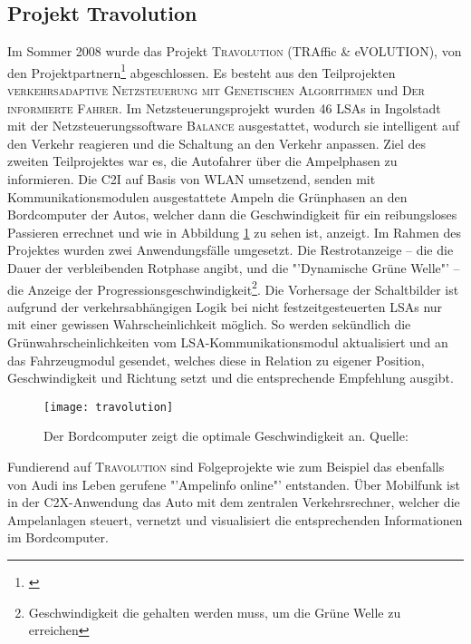 \subsection*{\label{sec:travolution}Projekt Travolution}
Im Sommer 2008 wurde das Projekt \textsc{Travolution} (TRAffic \& eVOLUTION), von den Projektpartnern\footnote{\cite{Travolution}} abgeschlossen. Es besteht aus den Teilprojekten \textsc{verkehrsadaptive Netzsteuerung mit Genetischen Algorithmen} und \textsc{Der informierte Fahrer}. Im Netzsteuerungsprojekt wurden 46 \glspl{LSA} in Ingolstadt mit der Netzsteuerungssoftware \textsc{Balance} ausgestattet, wodurch sie intelligent auf den Verkehr reagieren und die Schaltung an den Verkehr anpassen.  Ziel des zweiten Teilprojektes war es, die Autofahrer über die Ampelphasen zu informieren. Die \gls{C2I} auf Basis von \gls{WLAN} umsetzend, senden mit Kommunikationsmodulen ausgestattete Ampeln die Grünphasen an den Bordcomputer der Autos, welcher dann die Geschwindigkeit für ein reibungsloses Passieren errechnet\cite{Stvtechnik} und wie in Abbildung \ref{fig:travolution} zu sehen ist, anzeigt. Im Rahmen des Projektes wurden zwei Anwendungsfälle umgesetzt. Die Restrotanzeige -- die die Dauer der verbleibenden Rotphase angibt, und die "'Dynamische Grüne Welle"' -- die Anzeige der Progressionsgeschwindigkeit\footnote{ Geschwindigkeit die gehalten werden muss, um die Grüne Welle zu erreichen}.
Die Vorhersage der Schaltbilder ist aufgrund der verkehrsabhängigen Logik bei nicht festzeitgesteuerten \glspl{LSA} nur mit einer gewissen Wahrscheinlichkeit möglich. So werden sekündlich die Grünwahrscheinlichkeiten vom \gls{LSA}-Kommunikationsmodul aktualisiert und an das Fahrzeugmodul gesendet, welches diese in Relation zu eigener Position, Geschwindigkeit und Richtung setzt und die entsprechende Empfehlung ausgibt.\\
\begin{figure}[H]  
    \centering  
    \texttt{[image: travolution]}   
    \grayRule
    \caption[Projekt Travolution]{Der Bordcomputer zeigt die optimale Geschwindigkeit an. Quelle: \cite{Travolution}}
    \label{fig:travolution}
\end{figure} 
Fundierend auf \textsc{Travolution} sind Folgeprojekte wie zum Beispiel das ebenfalls von Audi ins Leben gerufene "'Ampelinfo online"' entstanden. Über Mobilfunk ist in der \gls{C2X}-Anwendung das Auto mit dem zentralen Verkehrsrechner, welcher die Ampelanlagen steuert, vernetzt und visualisiert die entsprechenden Informationen im Bordcomputer. \cite{Ampelinfo}
